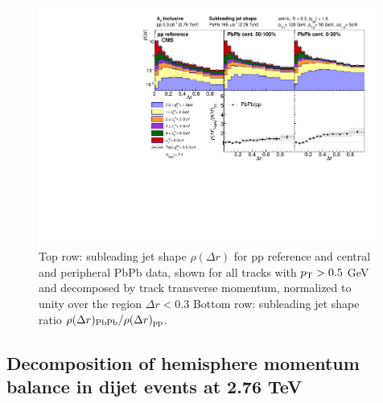 \begin{figure}[h!]
\begin{center} 
\includegraphics[width=0.99\textwidth]{figures/Results/JetShapes_SubLeading_WithHighpT_PAS.pdf}
\caption[Subleading jet shape at 2.76 TeV, shown differentially in $p_{\rm T}^{\rm trk}$]{Top row:  subleading jet shape $\rho(\Delta r)$ for pp reference and central and peripheral PbPb data, shown for all tracks with $p_{\rm T}> 0.5$ GeV and decomposed by track transverse momentum, normalized to unity over the region $\Delta r<0.3$ Bottom row:  subleading jet shape ratio $\rho(\Delta r)_{\rm PbPb}/\rho(\Delta r)_{\rm pp}$. }
\label{fig:JetShape_SubLeading} 
\end{center} 
\end{figure} 



\clearpage



\subsection{Decomposition of hemisphere momentum balance in dijet events at 2.76 TeV}
\label{sec:dijet_mpt}

